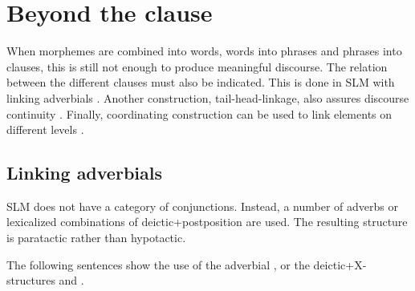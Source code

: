 \chapter{Beyond the clause}\label{sec:form:SuperclausalConstructions}
When morphemes are combined into words, words into phrases and phrases into clauses, this is still not enough to produce meaningful discourse. The relation between the different clauses must also be indicated. This is done in SLM with linking adverbials . Another construction, tail-head-linkage, also assures discourse continuity . Finally, coordinating construction can be used to link elements on different levels .

\section{Linking adverbials}\label{sec:constr:Linkingadverbials}
SLM does not have a category of conjunctions. Instead, a number of adverbs or lexicalized combinations of deictic+postposition are used. The resulting structure is paratactic rather than hypotactic. 



The following sentences show the use of the adverbial
 , or the deictic+X-structures
  and
 .


\\ 


